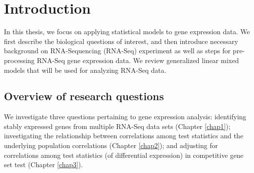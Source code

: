 \section{Introduction}\label{sec:intro}


In this thesis, we focus on applying statistical models to gene expression data. We first describe 
the biological questions of interest, and then introduce necessary background on 
RNA-Sequencing (RNA-Seq) experiment as well as steps for pre-processing RNA-Seq gene 
expression data. We review generalized linear mixed models that will be used for analyzing RNA-Seq 
data.

\subsection{Overview of research questions}\label{subsec:biol}


We investigate three questions pertaining to gene expression analysis: identifying 
stably expressed genes from multiple RNA-Seq data sets (Chapter \ref{chap1}); 
investigating the relationship between correlations among test statistics and the underlying 
population correlations (Chapter \ref{chap2}); and adjusting for correlations among test 
statistics (of differential expression) in competitive gene set test (Chapter \ref{chap3}). 

